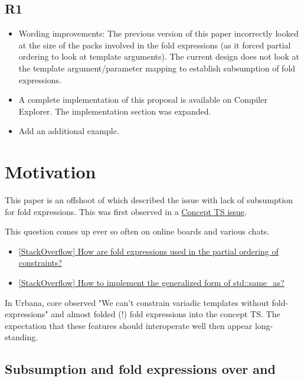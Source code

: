 \documentclass{wg21}
\begin{document}
\subsection{R1}

\begin{itemize}
\item Wording improvements: The previous version of this paper incorrectly looked at the size of the packs involved in the fold expressions (as it forced partial ordering to look at template arguments).
The current design does not look at the template argument/parameter mapping to establish subsumption of fold expressions.
\item A complete implementation of this proposal is available on Compiler Explorer. The implementation section was expanded.
\item Add an additional example.
\end{itemize}

\section{Motivation}

This paper is an offshoot of  which described the issue with lack of subsumption for fold expressions.
This was first observed in a \href{http://cplusplus.github.io/concepts-ts/ts-active.html#28}{Concept TS issue}.

This question comes up ever so often on online boards and various chats.

\begin{itemize}
\item \href{https://stackoverflow.com/questions/34843745}{[StackOverflow] How are fold expressions used in the partial ordering of constraints?}
\item \href{https://stackoverflow.com/questions/58724459/}{[StackOverflow] How to implement the generalized form of std::same_as?}
\end{itemize}

In Urbana, core observed "We can't constrain variadic templates without fold-expressions" and almost folded (!) fold expressions into the concept TS.
The expectation that these features should interoperate well then appear long-standing.

\subsection{Subsumption and fold expressions over \tcode{\&\&} and \tcode{||}}
\end{document}

